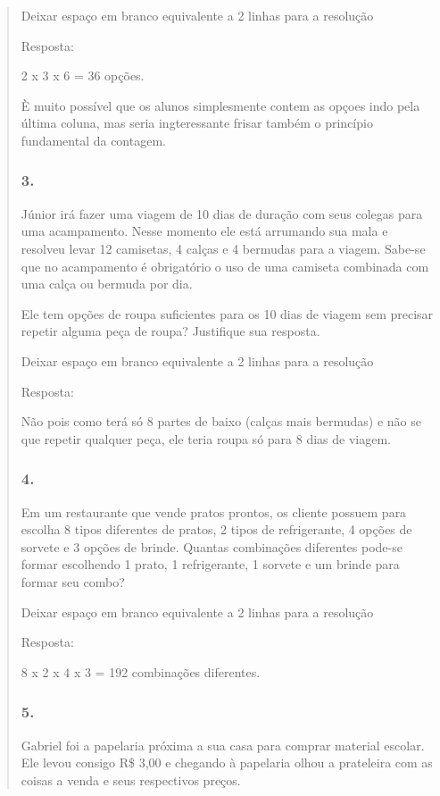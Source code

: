 \begin{enumerate}
\begin{escolha}
\begin{enumerate}
\begin{itemize}
\begin{itemize}
\begin{escolha}
\begin{quote}
\begin{escolha}
{Deixar espaço em branco equivalente a 2 linhas para a resolução

Resposta:

2 x 3 x 6 = 36 opções.

È muito possível que os alunos simplesmente contem as opçoes indo pela
última coluna, mas seria ingteressante frisar também o princípio
fundamental da contagem.

\subsubsection{3.}\label{section-132}

Júnior irá fazer uma viagem de 10 dias de duração com seus colegas para
uma acampamento. Nesse momento ele está arrumando sua mala e resolveu
levar 12 camisetas, 4 calças e 4 bermudas para a viagem. Sabe-se que no
acampamento é obrigatório o uso de uma camiseta combinada com uma calça
ou bermuda por dia.

Ele tem opções de roupa suficientes para os 10 dias de viagem sem
precisar repetir alguma peça de roupa? Justifique sua resposta.

Deixar espaço em branco equivalente a 2 linhas para a resolução

Resposta:

Não pois como terá só 8 partes de baixo (calças mais bermudas) e não se
que repetir qualquer peça, ele teria roupa só para 8 dias de viagem.

\subsubsection{4.}\label{section-133}

Em um restaurante que vende pratos prontos, os cliente possuem para
escolha 8 tipos diferentes de pratos, 2 tipos de refrigerante, 4 opções
de sorvete e 3 opções de brinde. Quantas combinações diferentes pode-se
formar escolhendo 1 prato, 1 refrigerante, 1 sorvete e um brinde para
formar seu combo?

Deixar espaço em branco equivalente a 2 linhas para a resolução

Resposta:

8 x 2 x 4 x 3 = 192 combinações diferentes.

\subsubsection{5.}\label{section-134}

Gabriel foi a papelaria próxima a sua casa para comprar material
escolar. Ele levou consigo R\$ 3,00 e chegando à papelaria olhou a
prateleira com as coisas a venda e seus respectivos preços.

}
\end{escolha}
\end{quote}
\end{escolha}
\end{itemize}
\end{itemize}
\end{enumerate}
\end{escolha}
\end{enumerate}
